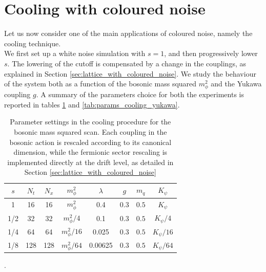 \section{Cooling with coloured noise}
Let us now consider one of the main applications of coloured noise, namely the cooling technique. \\
We first set up a white noise simulation with $s=1$, and then progressively lower $s$. The lowering of the cutoff is compensated by a change in the couplings, as explained in Section \ref{sec:lattice_with_coloured_noise}. 
We study the behaviour of the system both as a function of the bosonic mass squared $m_\phi^2$ and the Yukawa coupling $g$. 
A summary of the parameters choice for both the experiments is reported in tables \ref{tab:params_cooling} and \ref{tab:params_cooling_yukawa}.
\begin{table}[htp]
    \centering
    \begin{tabular}{cccccccc}
        \toprule
        $s$ & $N_t$ & $N_x$ & $m_\phi^2$ & $\lambda$ & $g$ & $m_q$& $K_\psi$ \\
        \midrule 
        1 & 16 & 16 & $m_\phi^2$ & 0.4 & 0.3 & $0.5$ & $K_\psi$ \\
        1/2 & 32 & 32 & $m_\phi^2/4$ & 0.1 & 0.3 & $0.5$ & $K_\psi/4$ \\
        1/4 & 64 & 64 & $m_\phi^2/16$ & 0.025 & 0.3 & $0.5$ & $K_\psi/16$ \\
        1/8 & 128 & 128 & $m_\phi^2/64$ & 0.00625 & 0.3 & $0.5$ & $K_\psi/64$ \\
        \bottomrule
    \end{tabular}
    \caption[Parameter settings in the cooling procedure for the bosonic mass squared scan]{Parameter settings in the cooling procedure for the bosonic mass squared scan. Each coupling in the bosonic action is rescaled according to its canonical dimension, while the fermionic sector rescaling is implemented directly at the drift level, as detailed in Section \ref{sec:lattice_with_coloured_noise}}.
    \label{tab:params_cooling}
\end{table}
